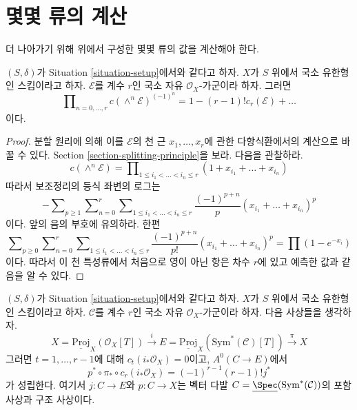 \section{몇몇 류의 계산}
\label{section-calculate}

\noindent
더 나아가기 위해 위에서 구성한 몇몇 류의 값을 계산해야 한다.

\begin{lemma}
\label{lemma-compute-koszul}
$(S, \delta)$가 Situation \ref{situation-setup}에서와 같다고 하자.
$X$가 $S$ 위에서 국소 유한형인 스킴이라고 하자. $\mathcal{E}$를
계수 $r$인 국소 자유 $\mathcal{O}_X$-가군이라 하자. 그러면
$$
\prod\nolimits_{n = 0, \ldots, r} c(\wedge^n \mathcal{E})^{(-1)^n} =
1 - (r - 1)! c_r(\mathcal{E}) + \ldots
$$
이다.
\end{lemma}

\begin{proof}
분할 원리에 의해 이를 $\mathcal{E}$의 천 근
$x_1, \ldots, x_r$에 관한 다항식환에서의 계산으로 바꿀 수 있다.
Section \ref{section-splitting-principle}을 보라. 다음을 관찰하라.
$$
c(\wedge^n \mathcal{E}) =
\prod\nolimits_{1 \leq i_1 < \ldots < i_n \leq r}
(1 + x_{i_1} + \ldots + x_{i_n})
$$
따라서 보조정리의 등식 좌변의 로그는
$$
-
\sum\nolimits_{p \geq 1}
\sum\nolimits_{n = 0}^r
\sum\nolimits_{1 \leq i_1 < \ldots < i_n \leq r}
\frac{(-1)^{p + n}}{p}(x_{i_1} + \ldots + x_{i_n})^p
$$
이다. 앞의 음의 부호에 유의하라. 한편
$$
\sum\nolimits_{p \geq 0}
\sum\nolimits_{n = 0}^r
\sum\nolimits_{1 \leq i_1 < \ldots < i_n \leq r}
\frac{(-1)^{p + n}}{p!}(x_{i_1} + \ldots + x_{i_n})^p
=
\prod (1 - e^{-x_i})
$$
이다. 따라서 이 천 특성류에서 처음으로 영이 아닌 항은 차수 $r$에
있고 예측한 값과 같음을 알 수 있다.
\end{proof}

\begin{lemma}
\label{lemma-compute-section}
$(S, \delta)$가 Situation \ref{situation-setup}에서와 같다고 하자.
$X$가 $S$ 위에서 국소 유한형인 스킴이라고 하자. $\mathcal{C}$를
계수 $r$인 국소 자유 $\mathcal{O}_X$-가군이라 하자. 다음 사상들을
생각하자.
$$
X = \underline{\text{Proj}}_X(\mathcal{O}_X[T])
\xrightarrow{i}
E = \underline{\text{Proj}}_X(\text{Sym}^*(\mathcal{C})[T])
\xrightarrow{\pi}
X
$$
그러면 $t = 1, \ldots, r - 1$에 대해 $c_t(i_*\mathcal{O}_X) = 0$이고,
$A^0(C \to E)$에서
$$
p^* \circ \pi_* \circ c_r(i_*\mathcal{O}_X) = (-1)^{r - 1}(r - 1)! j^*
$$
가 성립한다. 여기서 $j : C \to E$와 $p : C \to X$는 벡터 다발
$C = \underline{\Spec}(\text{Sym}^*(\mathcal{C}))$의 포함 사상과
구조 사상이다.
\end{lemma}

